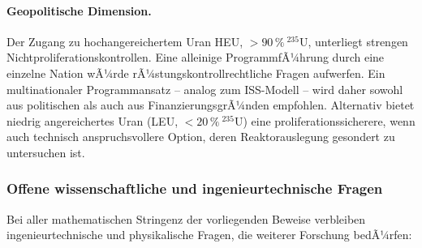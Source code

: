 ﻿\documentclass[a4paper,12pt,twoside]{article}
\theoremstyle{plain}
\theoremstyle{definition}
\theoremstyle{remark}
\begin{document}
	\paragraph{Geopolitische Dimension.}
	Der Zugang zu hochangereichertem Uran HEU, $>90\,\%\ ^{235}$U,
	unterliegt strengen Nichtproliferationskontrollen. Eine alleinige
	ProgrammfÃ¼hrung durch eine einzelne Nation wÃ¼rde rÃ¼stungskontrollrechtliche
	Fragen aufwerfen. Ein multinationaler Programmansatz -- analog zum ISS-Modell --
	wird daher sowohl aus politischen als auch aus FinanzierungsgrÃ¼nden empfohlen.
	Alternativ bietet niedrig angereichertes Uran (LEU, $<20\,\%\ ^{235}$U)
	eine proliferationssicherere, wenn auch technisch anspruchsvollere Option,
	deren Reaktorauslegung gesondert zu untersuchen ist.

	\subsubsection{Offene wissenschaftliche und ingenieurtechnische Fragen}

	Bei aller mathematischen Stringenz der vorliegenden Beweise verbleiben
	ingenieur\-technische und physikalische Fragen, die weiterer Forschung bedÃ¼rfen:
\end{document}
